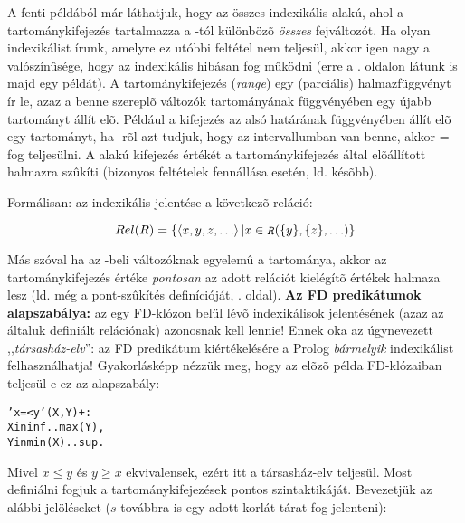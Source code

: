 A fenti példából már láthatjuk, hogy az összes indexikális  alakú, ahol a  tartománykifejezés tartalmazza a
-tól különbözõ \emph{összes} fejváltozót. Ha olyan indexikálist
írunk, amelyre ez utóbbi feltétel nem teljesül, akkor igen nagy a valószínûsége,
hogy az indexikális hibásan fog mûködni (erre a \pageref{hibas_indexikalis}. oldalon
látunk is majd egy példát). A  tartománykifejezés (\emph{range})
egy (parciális) halmazfüggvényt ír le, azaz a benne szereplõ változók tartományának
függvényében egy újabb tartományt állít elõ. Például a  kifejezés
az  alsó határának függvényében állít elõ egy tartományt, ha -rõl azt
tudjuk, hogy az  intervallumban van benne, akkor  = 
fog teljesülni. A  alakú kifejezés 
értékét a  tartománykifejezés által elõállított halmazra szûkíti (bizonyos
feltételek fennállása esetén, ld. késõbb). 

Formálisan: az  indexikális jelentése a következõ
reláció:

\[
Rel(R) =  \{ \tuple{x,y,z, \ldots} | x \in \parbox{0.6em}{\tt\em R}(\{y\},\{z\}, \ldots)\}
\]

Más szóval ha az -beli változóknak egyelemû a tartománya, akkor az
 tartománykifejezés értéke \emph{pontosan} az adott relációt kielégítõ 
értékek halmaza lesz (ld. még a pont-szûkítés definícióját, \pageref{pontszukites}. oldal).
\br
{\bf Az FD predikátumok alapszabálya:} az egy FD-klózon belül lévõ indexikálisok
jelentésének (azaz az általuk definiált relációnak) azonosnak kell lennie! Ennek oka
az úgynevezett ,,\emph{társasház-elv}'': az FD predikátum kiértékelésére a Prolog
\emph{bármelyik} indexikálist felhasználhatja! Gyakorlásképp nézzük meg, hogy az elõzõ
példa FD-klózaiban teljesül-e ez az alapszabály:

\begin{alltt}
'x=<y'(X, Y) +: 
    X in inf..max(Y), % \(\{\tuple{x,y}|x\in{}\cd{inf..max(\{}y\cd{\})}\} \equiv \{\tuple{x,y}|x\in{}(-\infty,y]\} \equiv \{\tuple{x,y}|x\leq{}y\}\)
    Y in min(X)..sup. % \(\{\tuple{x,y}|y\in{}\cd{min(\{}x\cd{\})..sup}\} \equiv \{\tuple{x,y}|y\in{}[x,+\infty)\} \equiv \{\tuple{x,y}|y\geq{}x\}\)
\end{alltt}

Mivel $x \leq y$ és $y \geq x$ ekvivalensek, ezért itt a társasház-elv teljesül.
\br
Most definiálni fogjuk a tartománykifejezések pontos szintaktikáját. Bevezetjük az
alábbi jelöléseket ($s$ továbbra is egy adott korlát-tárat fog jelenteni):

